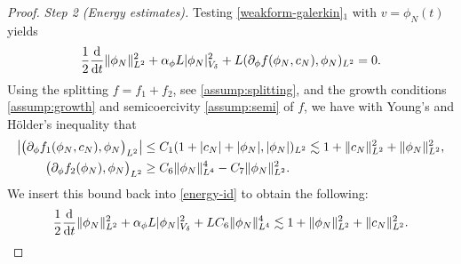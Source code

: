 \documentclass[]{article}
\newcommand{\eps}{\varepsilon}
\newcommand{\ddt}{\frac{\textup{d}}{\textup{d}t}}
\DeclarePairedDelimiter{\abs}{\lvert}{\rvert}
\DeclarePairedDelimiter{\norm}{\lVert}{\rVert}
\begin{document}
\begin{proof}
	\noindent\emph{Step 2 (Energy estimates).}
	Testing \eqref{weakform-galerkin}$_1$ with $v=\phi_N(t)$ yields
	\begin{equation}\label{energy-id}
		\frac12 \ddt \norm{\phi_N}_{L^2}^2
		+\alpha_\phi L \abs{\phi_N}_{V_\delta}^2
		+L(\partial_\phi f(\phi_N,c_N),\phi_N)_{L^2} =0.
	\end{equation}
	Using the splitting $f=f_1+f_2$, see \eqref{assump:splitting}, and the growth conditions \eqref{assump:growth} and semicoercivity \eqref{assump:semi} of $f$, we have with Young's and Hölder's inequality that
	$$\begin{aligned} 
		\bigl|\bigl(\partial_\phi f_1(\phi_N,c_N), \phi_N \bigr)_{L^2}\bigr| &\leq C_1 (1+\abs{c_N}+\abs{\phi_N},\abs{\phi_N})_{L^2} \lesssim 1+\norm{c_N}_{L^2}^2 + \norm{\phi_N}_{L^2}^2, \\
		\bigl(\partial_\phi f_2(\phi_N), \phi_N \bigr)_{L^2} &\geq C_6\norm{\phi_N}_{L^4}^4 - C_7 \norm{\phi_N}_{L^2}^2.
	\end{aligned}$$ %
	We insert this bound back into \eqref{energy-id} to obtain the following:
	\begin{equation} \label{Energy:Est1}
		\frac12 \ddt \norm{\phi_N}_{L^2}^2 + \alpha_\phi L  \abs{\phi_N}_{V_\delta}^2+ LC_6  \norm{\phi_N}_{L^4}^4
		\lesssim 1+ \norm{\phi_N}_{L^2}^2 +  \norm{c_N}_{L^2}^2.
	\end{equation}
	

\end{proof}
\end{document}
